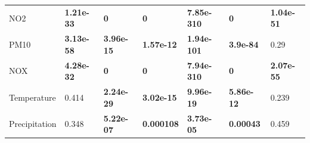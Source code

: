\documentclass[a4paper, 12pt]{article}
\begin{document}
\begin{table}[b!]
{\begin{tabular}{@{}lllllll@{}}
            NO2            & \textbf{1.21e-33}                                                                            & \textbf{0}                                                                                   & \textbf{0}                                                                                   & \textbf{7.85e-310}                                                                           & \textbf{0}                                                                                   & \textbf{1.04e-51}                                                                            \\
            PM10           & \textbf{3.13e-58}                                                                            & \textbf{3.96e-15}                                                                            & \textbf{1.57e-12}                                                                            & \textbf{1.94e-101}                                                                           & \textbf{3.9e-84}                                                                             & 0.29                                                                                         \\
            NOX            & \textbf{4.28e-32}                                                                            & \textbf{0}                                                                                   & \textbf{0}                                                                                   & \textbf{7.94e-310}                                                                           & \textbf{0}                                                                                   & \textbf{2.07e-55}                                                                            \\
            Temperature    & 0.414                                                                                        & \textbf{2.24e-29}                                                                            & \textbf{3.02e-15}                                                                            & \textbf{9.96e-19}                                                                            & \textbf{5.86e-12}                                                                            & 0.239                                                                                        \\
            Precipitation  & 0.348                                                                                        & \textbf{5.22e-07}                                                                            & \textbf{0.000108}                                                                            & \textbf{3.73e-05}                                                                            & \textbf{0.00043}                                                                             & 0.459                                                                                        \\

\end{tabular}}
\end{table}
\end{document}
